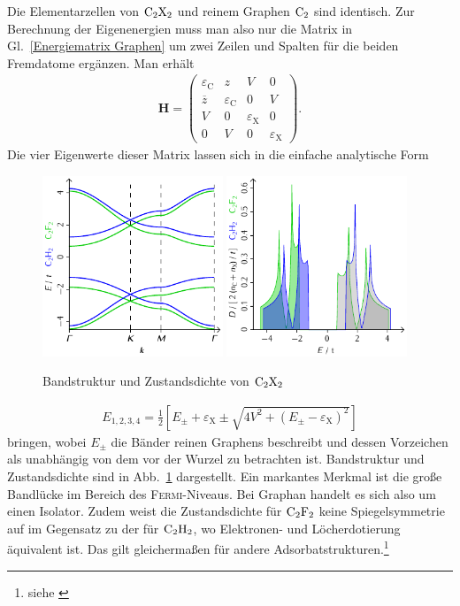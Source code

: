 \documentclass[a4paper, 10pt, twoside, openany]{book} %
\newcommand \bracks[1]{\left [ #1 \right ]}
\def \vec {\boldsymbol}
\def \eC {\varepsilon_\mathrm{C}}
\def \eX {\varepsilon_\mathrm{X}}
\begin{document}
Die Elementarzellen von $\rm C_2X_2$ und reinem Graphen $\rm C_2$ sind identisch. Zur Berechnung der Eigenenergien muss man also nur die Matrix in Gl.~\ref{Energiematrix Graphen} um zwei Zeilen und Spalten für die beiden Fremdatome ergänzen. Man erhält
%
\begin{align*}
    \vec H =
    \begin{pmatrix}
        \eC         & z   &   V &  0 \\
        \overline z & \eC &   0 &  V \\
         V          & 0   & \eX &  0 \\
         0          & V   &   0 & \eX
    \end{pmatrix}.
\end{align*}
%
Die vier Eigenwerte dieser Matrix lassen sich in die einfache analytische Form
%
\begin{figure}
    \includegraphics[width=0.48\textwidth]{Abbildungen/Bandstrukturen/C2X2.pdf}
    \hfill
    \includegraphics[width=0.48\textwidth]{Abbildungen/Bandstrukturen/DOS_C2X2.pdf}
    \caption{Bandstruktur und Zustandsdichte von $\rm C_2X_2$}
    \label{C2X2}
\end{figure}
%
\begin{align*}
    E_{1, 2, 3, 4} = \frac 1 2 \bracks{E_\pm + \eX \pm \sqrt{4 V^2 + (E_\pm - \eX)^2}}
\end{align*}
%
bringen, wobei $E_\pm$ die Bänder reinen Graphens beschreibt und dessen Vorzeichen als unabhängig von dem vor der Wurzel zu betrachten ist. Bandstruktur und Zustandsdichte sind in Abb.~\ref{C2X2} dargestellt. Ein markantes Merkmal ist die große Bandlücke im Bereich des \textsc{Fermi}-Niveaus. Bei Graphan handelt es sich also um einen Isolator. Zudem weist die Zustandsdichte für $\rm C_2F_2$ keine Spiegelsymmetrie auf im Gegensatz zu der für $\rm C_2H_2$, wo Elektronen- und Löcherdotierung äquivalent ist. Das gilt gleichermaßen für andere Adsorbatstrukturen.\footnote{siehe \cite[S. 3]{Wehling2}}
\end{document}
